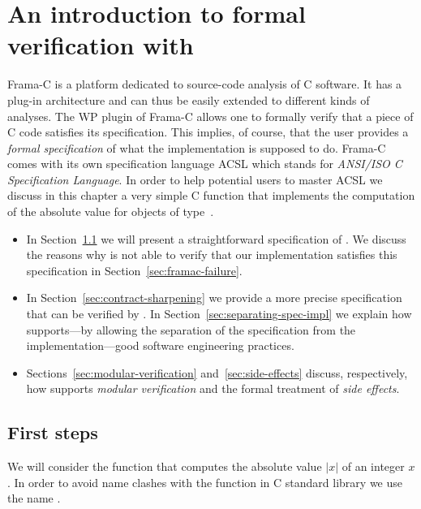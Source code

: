 
\chapter{An introduction to formal verification with \framacwp}
\label{sec:frama-c}

Frama-C is a platform dedicated to source-code analysis of C software.
It has a plug-in architecture and can thus be easily extended to 
different kinds of analyses.
The WP plugin of Frama-C allows one to formally verify that a piece of
C code satisfies its specification.
This implies, of course, that the user provides a \emph{formal specification}
of what the implementation is supposed to do.
Frama-C comes with its own specification language ACSL which stands for
\emph{ANSI\slash ISO C Specification Language}.
In order to help potential users to master ACSL we discuss in this chapter 
a very simple C function  that implements the computation of
the absolute value for objects of type~.

\begin{itemize}
\item
In Section~\ref{sec:first-steps} we will present a straightforward
specification of .
We discuss the reasons why \framacwp is not able to verify that our
implementation satisfies this specification in Section~\ref{sec:framac-failure}.

\item 
In Section~\ref{sec:contract-sharpening} we provide a more precise
specification that can be verified by \framacwp.
In Section~\ref{sec:separating-spec-impl} we explain
how \framac supports---by allowing the separation of the specification from the 
implementation---good software engineering practices.

\item
Sections~\ref{sec:modular-verification} and~\ref{sec:side-effects}
discuss, respectively,
how \framacwp supports \emph{modular verification} and the
formal treatment of \emph{side effects}.
\end{itemize}

\clearpage

\section{First steps}
\label{sec:first-steps}

We will consider the function that computes the absolute value $|x|$
of an integer $x$.
In order to avoid name clashes with the function  in C standard library
we use the name .

